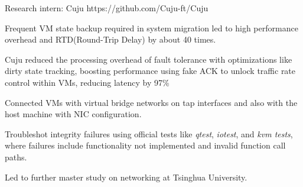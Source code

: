
\vspace{-2mm}

\begin{cventries}

  
\cventry
  {} %
  {Research intern: Cuju} %
  {} %
  {https://github.com\linebreak/Cuju-ft/Cuju} %
  {
    \vspace{-2mm}
    \begin{cvitems} %
      \item {Frequent VM state backup required in system migration led to high performance overhead and RTD(Round-Trip Delay) by about 40 times.}
      \item {Cuju reduced the processing overhead of fault tolerance with optimizations like dirty state tracking, boosting performance using fake ACK to unlock traffic rate control within VMs, reducing latency by 97\%}
      \item {Connected VMs with virtual bridge networks on tap interfaces and also with the host machine with NIC configuration.}
      \item {Troubleshot integrity failures using official tests like \emph{qtest}, \emph{iotest}, and \emph{kvm tests}, where failures include functionality not implemented and invalid function call paths. }
      \item {Led to further master study on networking at Tsinghua University.}
    \end{cvitems}
  }

  \vspace{-3mm}


\end{cventries}
